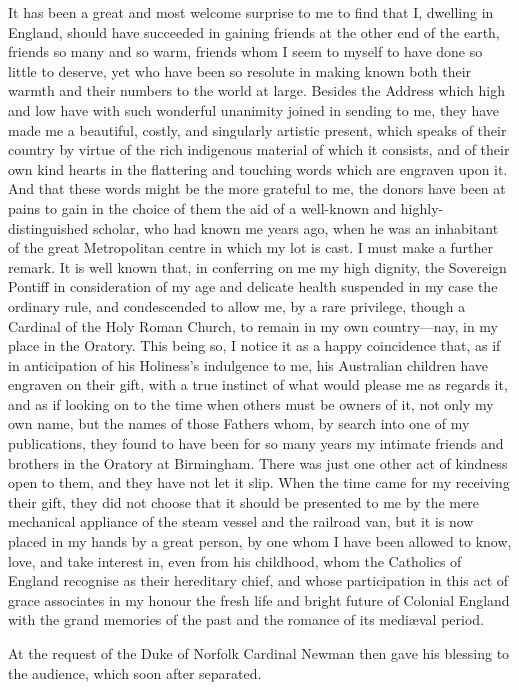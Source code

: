 It has been a great and most welcome surprise to me to find that I,
dwelling in England, should have succeeded in gaining friends at the
other end of the earth, friends so many and so warm, friends whom I
seem to myself to have done so little to deserve, yet who have been so
resolute in making known both their warmth and their numbers to the
world at large. Besides the Address which high and low have with such
wonderful unanimity joined in sending to me, they have made me a
beautiful, costly, and singularly artistic present, which speaks of
their country by virtue of the rich indigenous material of which it
consists, and of their own kind hearts in the flattering and touching
words which are engraven upon it. And that these words might be the
more grateful to me, the donors have been at pains to gain in the
choice of them the aid of a well-known and highly-distinguished
scholar, who had known me years ago, when he was an inhabitant of the
great Metropolitan centre in which my lot is cast. I must make a
further remark. It is well known that, in conferring on me my
high dignity, the Sovereign Pontiff in consideration of my age and
delicate health suspended in my case the ordinary rule, and
condescended to allow me, by a rare privilege, though a Cardinal of
the Holy Roman Church, to remain in my own country—nay, in my place
in the Oratory. This being so, I notice it as a happy coincidence
that, as if in anticipation of his Holiness's indulgence to me, his
Australian children have engraven on their gift, with a true instinct
of what would please me as regards it, and as if looking on to the
time when others must be owners of it, not only my own name, but the
names of those Fathers whom, by search into one of my publications,
they found to have been for so many years my intimate friends and
brothers in the Oratory at Birmingham. There was just one other act of
kindness open to them, and they have not let it slip. When the time
came for my receiving their gift, they did not choose that it should
be presented to me by the mere mechanical appliance of the steam
vessel and the railroad van, but it is now placed in my hands by a
great person, by one whom I have been allowed to know, love, and
take interest in, even from his childhood, whom the Catholics of
England recognise as their hereditary chief, and whose participation
in this act of grace associates in my honour the fresh life and bright
future of Colonial England with the grand memories of the past and the
romance of its mediæval period.

At the request of the Duke of Norfolk Cardinal Newman then gave his
blessing to the audience, which soon after separated.

